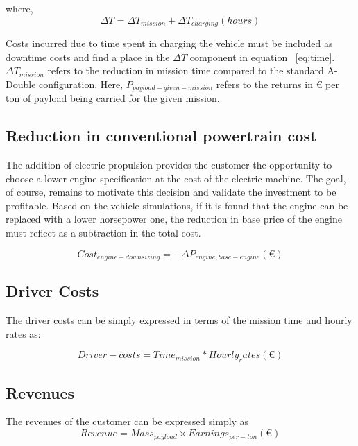 \documentclass[ExampleMasters.tex]{subfiles}
\begin{document}
			where,
			\begin{equation}
				\Delta T = \Delta T_{mission}+\Delta T_{charging} (hours)
			\end{equation}

			Costs incurred due to time spent in charging the vehicle must be included as downtime costs and find a place in the $\Delta T$ component in equation ~\ref{eq:time}. $\Delta T_{mission}$ refers to the reduction in mission time compared to the standard A-Double configuration. Here, $P_{payload-given-mission}$ refers to the returns in \euro{} per ton of payload being carried for the given mission. 

		\subsection{Reduction in conventional powertrain cost}
			The addition of electric propulsion provides the customer the opportunity to choose a lower engine specification at the cost of the electric machine. The goal, of course, remains to motivate this decision and validate the investment to be profitable. Based on the vehicle simulations, if it is found that the engine can be replaced with a lower horsepower one, the reduction in base price of the engine must reflect as a subtraction in the total cost.

			\begin{equation}
				Cost_{engine-downsizing} = -\Delta P_{engine,base-engine} (\euro{})
			\end{equation}

		\subsection{Driver Costs}
			The driver costs can be simply expressed in terms of the mission time and hourly rates as:

			\begin{equation}
			Driver-costs = Time_{mission} * Hourly_rates (\euro{})
			\end{equation}

		\subsection{Revenues}
			The revenues of the customer can be expressed simply as
			\begin{equation}
			Revenue = Mass_{payload} \times Earnings_{per-ton} (\euro{})
			\end{equation}
	
\end{document}
